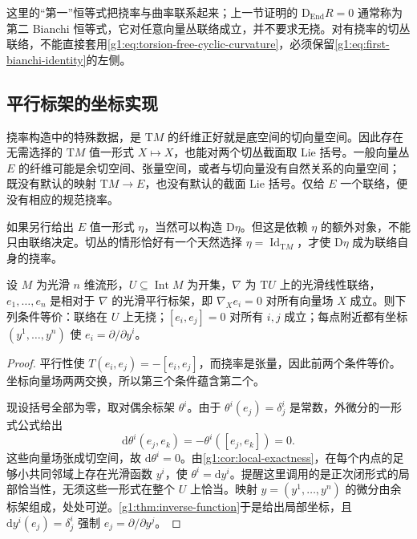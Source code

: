 这里的“第一”恒等式把挠率与曲率联系起来；上一节证明的 \(\mathrm{D}_{\operatorname{End}}R=0\) 通常称为第二 Bianchi 恒等式，它对任意向量丛联络成立，并不要求无挠。对有挠率的切丛联络，不能直接套用\eqref{g1:eq:torsion-free-cyclic-curvature}，必须保留\eqref{g1:eq:first-bianchi-identity}的左侧。

\subsection{平行标架的坐标实现}
\label{g1:subsec:1504:04}

挠率构造中的特殊数据，是 \(\mathrm{T}M\) 的纤维正好就是底空间的切向量空间。因此存在无需选择的 \(\mathrm{T}M\) 值一形式 \(X\mapsto X\)，也能对两个切丛截面取 Lie 括号。一般向量丛 \(E\) 的纤维可能是余切空间、张量空间，或者与切向量没有自然关系的向量空间；既没有默认的映射 \(\mathrm{T}M\to E\)，也没有默认的截面 Lie 括号。仅给 \(E\) 一个联络，便没有相应的规范挠率。

\ProseParagraphBreak

如果另行给出 \(E\) 值一形式 \(\eta\)，当然可以构造 \(\mathrm{D}\eta\)。但这是依赖 \(\eta\) 的额外对象，不能只由联络决定。切丛的情形恰好有一个天然选择 \(\eta=\operatorname{Id}_{\mathrm{T}M}\)，才使 \(\mathrm{D}\eta\) 成为联络自身的挠率。

\begin{proposition}\label{g1:prop:parallel-coordinate-frame}
	设 \(M\) 为光滑 \(n\) 维流形，\(U\subseteq\operatorname{Int}M\) 为开集，\(\nabla\) 为 \(\mathrm{T}U\) 上的光滑线性联络，\(e_1,\ldots,e_n\) 是相对于 \(\nabla\) 的光滑平行标架，即 \(\nabla_Xe_i=0\) 对所有向量场 \(X\) 成立。则下列条件等价：联络在 \(U\) 上无挠；\([e_i,e_j]=0\) 对所有 \(i,j\) 成立；每点附近都有坐标 \((y^1,\ldots,y^n)\) 使 \(e_i=\partial/\partial y^i\)。
\end{proposition}
\begin{proof}
	平行性使 \(T(e_i,e_j)=-[e_i,e_j]\)，而挠率是张量，因此前两个条件等价。坐标向量场两两交换，所以第三个条件蕴含第二个。

	现设括号全部为零，取对偶余标架 \(\theta^i\)。由于 \(\theta^i(e_j)=\delta^i_j\) 是常数，外微分的一形式公式给出
	\[
		\mathrm{d}\theta^i(e_j,e_k)=-\theta^i([e_j,e_k])=0.
	\]
	这些向量场张成切空间，故 \(\mathrm{d}\theta^i=0\)。由\cref{g1:cor:local-exactness}，在每个内点的足够小共同邻域上存在光滑函数 \(y^i\)，使 \(\theta^i=\mathrm{d}y^i\)。提醒这里调用的是正次闭形式的局部恰当性，无须这些一形式在整个 \(U\) 上恰当。映射 \(y=(y^1,\ldots,y^n)\) 的微分由余标架组成，处处可逆。\cref{g1:thm:inverse-function}于是给出局部坐标，且 \(\mathrm{d}y^i(e_j)=\delta^i_j\) 强制 \(e_j=\partial/\partial y^j\)。
\end{proof}

